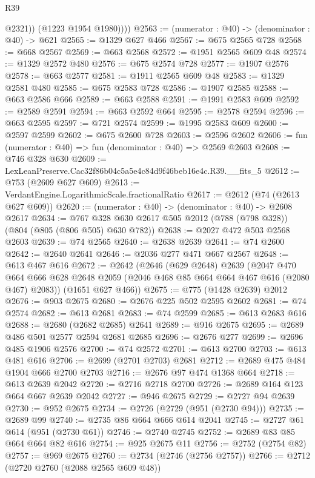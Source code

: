 \begin{lexlean}{R39}
\begin{coremodule}
              @2321))
          (@1223 @1954 @1980))))
@2563 := (numerator : @40) -> (denominator : @40) -> @621
@2565 := @1329 @627 @466
@2567 := @675 @2565 @728
@2568 := @668 @2567
@2569 := @663 @2568
@2572 := @1951 @2565 @609 @48
@2574 := @1329 @2572 @480
@2576 := @675 @2574 @728
@2577 := @1907 @2576
@2578 := @663 @2577
@2581 := @1911 @2565 @609 @48
@2583 := @1329 @2581 @480
@2585 := @675 @2583 @728
@2586 := @1907 @2585
@2588 := @663 @2586 @666
@2589 := @663 @2588
@2591 := @1991 @2583 @609
@2592 := @2589 @2591
@2594 := @663 @2592 @664
@2595 := @2578 @2594
@2596 := @663 @2595
@2597 := @721 @2574
@2599 := @1995 @2583 @609
@2600 := @2597 @2599
@2602 := @675 @2600 @728
@2603 := @2596 @2602
@2606 := fun (numerator : @40) => fun (denominator : @40) => @2569 @2603
@2608 := @746 @328 @630
@2609 := LexLeanPreserve.Cac32f86b04c5a5e4c84d9f46beb16e4c.R39.__fits_5
@2612 := @753 (@2609 @627 @609)
@2613 := VerdantEngine.LogarithmicScale.fractionalRatio
@2617 := @2612 (@74 (@2613 @627 @609))
@2620 := (numerator : @40) -> (denominator : @40) -> @2608 @2617
@2634 := @767 @328 @630 @2617 @505 @2012 (@788 (@798 @328)) (@804 (@805 (@806 @505) @630 @782))
@2638 := @2027 @472 @503 @2568 @2603
@2639 := @74 @2565
@2640 := @2638 @2639
@2641 := @74 @2600
@2642 := @2640 @2641
@2646 := @2036 @277 @471 @667 @2567
@2648 := @613 @467 @616
@2672 := @2642
    (@2646
      (@629 @2648)
      @2639
      (@2047
        @470
        @664
        @666
        @628
        @2648
        @2059
        (@2046 @468 @85 @664 @664 @467 @616 (@2080 @467) @2083))
      (@1651 @627 @466))
@2675 := @775 (@1428 @2639) @2012
@2676 := @903 @2675
@2680 := @2676 @225 @502 @2595 @2602
@2681 := @74 @2574
@2682 := @613 @2681
@2683 := @74 @2599
@2685 := @613 @2683 @616
@2688 := @2680 (@2682 @2685) @2641
@2689 := @916 @2675
@2695 := @2689 @486 @501 @2577 @2594 @2681 @2685
@2696 := @2676 @277
@2699 := @2696 @485 @1906 @2576
@2700 := @74 @2572
@2701 := @613 @2700
@2703 := @613 @481 @616
@2706 := @2699 (@2701 @2703) @2681
@2712 := @2689 @475 @484 @1904 @666 @2700 @2703
@2716 := @2676 @97 @474 @1368 @664
@2718 := @613 @2639 @2042
@2720 := @2716 @2718 @2700
@2726 := @2689 @164 @123 @664 @667 @2639 @2042
@2727 := @946 @2675
@2729 := @2727 @94 @2639
@2730 := @952 @2675
@2734 := @2726 (@2729 (@951 (@2730 @94)))
@2735 := @2689 @99
@2740 := @2735 @86 @664 @666 @614 @2041
@2745 := @2727 @61 @614 (@951 (@2730 @61))
@2746 := @2740 @2745
@2752 := @2689 @83 @85 @664 @664 @82 @616
@2754 := @925 @2675 @11
@2756 := @2752 (@2754 @82)
@2757 := @969 @2675
@2760 := @2734 (@2746 (@2756 @2757))
@2766 := @2712 (@2720 @2760 (@2088 @2565 @609 @48))

\end{coremodule}
\end{lexlean}
